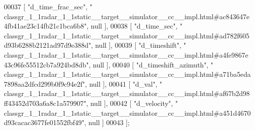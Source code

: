 \begin{DoxyCode}
00037     [ \textcolor{stringliteral}{"d\_time\_frac\_sec"}, \textcolor{stringliteral}{"
      classgr\_1\_1radar\_1\_1static\_\_target\_\_simulator\_\_cc\_\_impl.html#ac843647e4fb41ae23c14fb21c1bca6b8"}, null ],
00038     [ \textcolor{stringliteral}{"d\_time\_sec"}, \textcolor{stringliteral}{"
      classgr\_1\_1radar\_1\_1static\_\_target\_\_simulator\_\_cc\_\_impl.html#ad782f605d93b6288b2121ad97d9e388d"}, null ],
00039     [ \textcolor{stringliteral}{"d\_timeshift"}, \textcolor{stringliteral}{"
      classgr\_1\_1radar\_1\_1static\_\_target\_\_simulator\_\_cc\_\_impl.html#a4fe9867e43c96fe55512cb7a924bd8db"}, null ],
00040     [ \textcolor{stringliteral}{"d\_timeshift\_azimuth"}, \textcolor{stringliteral}{"
      classgr\_1\_1radar\_1\_1static\_\_target\_\_simulator\_\_cc\_\_impl.html#a71ba5eda7898aa2dfcd299b0f9c94e2f"}, null ],
00041     [ \textcolor{stringliteral}{"d\_val"}, \textcolor{stringliteral}{"
      classgr\_1\_1radar\_1\_1static\_\_target\_\_simulator\_\_cc\_\_impl.html#af67b2d98ff43452d703a6a8c1a579907"}, null ],
00042     [ \textcolor{stringliteral}{"d\_velocity"}, \textcolor{stringliteral}{"
      classgr\_1\_1radar\_1\_1static\_\_target\_\_simulator\_\_cc\_\_impl.html#a451d4670d93cacac3677fe01552fbf49"}, null ]
00043 ];
\end{DoxyCode}
